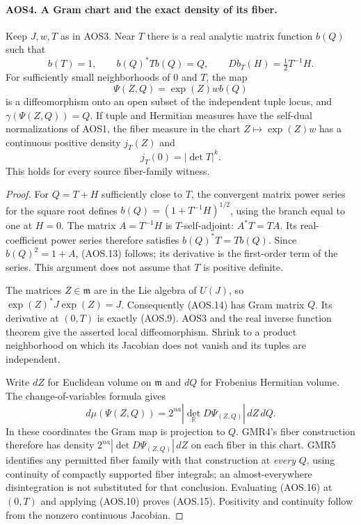 \documentclass[11pt,a4paper]{article}
\numberwithin{equation}{section}
\theoremstyle{remark}\newtheorem{remark}[theorem]{Remark}
\begin{document}
\paragraph{AOS4. A Gram chart and the exact density of its fiber.}
\label{claim:AOS4}
Keep $J,w,T$ as in AOS3.  Near $T$ there is a real analytic matrix
function $b(Q)$ such that
\[
 b(T)=1,\qquad b(Q)^*Tb(Q)=Q,
       \qquad Db_T(H)=\tfrac12T^{-1}H.
 \tag{AOS.13}
\]
For sufficiently small neighborhoods of $0$ and $T$, the map
\[
       \Psi(Z,Q)=\exp(Z)wb(Q)
 \tag{AOS.14}
\]
is a diffeomorphism onto an open subset of the independent tuple
locus, and $\gamma(\Psi(Z,Q))=Q$.  If tuple and Hermitian measures
have the self-dual normalizations of AOS1, the fiber measure in the
chart $Z\mapsto\exp(Z)w$ has a continuous positive density $j_T(Z)$
and
\[
                     j_T(0)=|\det T|^k.
 \tag{AOS.15}
\]
This holds for every source fiber-family witness.

\begin{proof}
For $Q=T+H$ sufficiently close to $T$, the convergent matrix power
series for the square root defines
$b(Q)=(1+T^{-1}H)^{1/2}$, using the branch equal to one at $H=0$.
The matrix $A=T^{-1}H$ is $T$-self-adjoint: $A^*T=TA$.
Its real-coefficient power series therefore satisfies
$b(Q)^*T=Tb(Q)$.  Since $b(Q)^2=1+A$, (AOS.13) follows;
its derivative is the first-order term of the series.  This argument
does not assume that $T$ is positive definite.

The matrices $Z\in\mathfrak m$ are in the Lie algebra of $U(J)$,
so $\exp(Z)^*J\exp(Z)=J$.  Consequently (AOS.14) has Gram matrix
$Q$.  Its derivative at $(0,T)$ is exactly (AOS.9).  AOS3 and the
real inverse function theorem give the asserted local diffeomorphism.
Shrink to a product neighborhood on which its Jacobian does not
vanish and its tuples are independent.

Write $dZ$ for Euclidean volume on $\mathfrak m$ and $dQ$ for
Frobenius Hermitian volume.  The change-of-variables formula gives
\[
       d\mu(\Psi(Z,Q))
         =2^{na}|\det_{\mathbb R}D\Psi_{(Z,Q)}|\,dZ\,dQ.
 \tag{AOS.16}
\]
In these coordinates the Gram map is projection to $Q$.  GMR4's
fiber construction therefore has density
$2^{na}|\det D\Psi_{(Z,Q)}|\,dZ$ on each fiber in this chart.
GMR5 identifies any permitted fiber family with that construction
at \emph{every} $Q$, using continuity of compactly supported fiber
integrals; an almost-everywhere disintegration is not substituted
for that conclusion.  Evaluating (AOS.16) at $(0,T)$ and applying
(AOS.10) proves (AOS.15).  Positivity and continuity follow from
the nonzero continuous Jacobian.
\end{proof}
\end{document}
